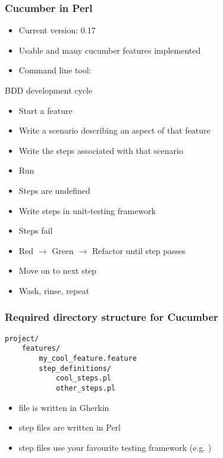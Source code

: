 \documentclass[10pt]{vcs_beamer}
\begin{document}
\begin{frame}
    \frametitle{Cucumber in Perl}

    \begin{itemize}
        \item Current version: 0.17
        \item Usable and many cucumber features implemented
        \item Command line tool: 
    \end{itemize}

\end{frame}

\begin{frame}{BDD development cycle}
    \begin{itemize}
        \item Start a feature
        \item Write a scenario describing an aspect of that feature
        \item Write the steps associated with that scenario
        \item Run 
        \item Steps are undefined
        \item Write steps in unit-testing framework
        \item Steps fail
        \item Red $\rightarrow$ Green $\rightarrow$ Refactor until step passes
        \item Move on to next step
        \item Wash, rinse, repeat
    \end{itemize}
\end{frame}

\begin{frame}[fragile]
\frametitle{Required directory structure for Cucumber}

\begin{lstlisting}
project/
    features/
        my_cool_feature.feature
        step_definitions/
            cool_steps.pl
            other_steps.pl
\end{lstlisting}

\begin{itemize}
    \item {} file is written in Gherkin
    \item step files are written in Perl
    \item step files use your favourite testing framework (e.g.
        )
\end{itemize}

\end{frame}
\end{document}
